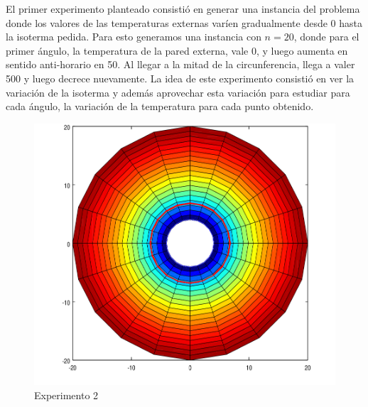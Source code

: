 El primer experimento planteado consistió en generar una instancia del problema donde los valores de las temperaturas externas varíen gradualmente desde 0 hasta la isoterma pedida. Para esto generamos una instancia con $n=20$, donde para el primer ángulo, la temperatura de la pared externa, vale $0$, y luego aumenta en sentido anti-horario en 50. Al llegar a la mitad de la circunferencia, llega a valer 500 y luego decrece nuevamente. La idea de este experimento consistió en ver la variación de la isoterma y además aprovechar esta variación para estudiar para cada ángulo, la variación de la temperatura para cada punto obtenido.
\\
\begin{figure}
  \vspace{-20pt}
  \begin{center}
    \includegraphics[scale= 0.4]{imagenes/hornoInvertidColoroConIso.png}
  \end{center}
  \vspace{-20pt}
  \caption{Experimento 2}
  \vspace{-10pt}
  \label{fig:Exp1}
\end{figure}

